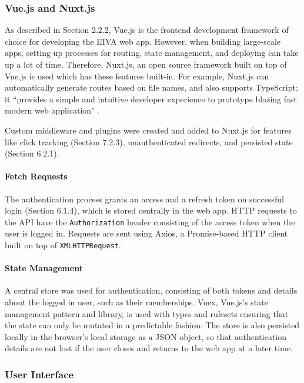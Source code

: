 \documentclass{article}
\begin{document}
\subsubsection{Vue.js and Nuxt.js}

As described in Section 2.2.2, Vue.js is the frontend development framework of choice for developing the EIVA web app. However, when building large-scale apps, setting up processes for routing, state management, and deploying can take up a lot of time. Therefore, Nuxt.js, an open source framework built on top of Vue.js is used which has these features built-in. For example, Nuxt.js can automatically generate routes based on file names, and also supports TypeScript; it ``provides a simple and intuitive developer experience to prototype blazing fast modern web application" \cite{alexchopin_announcing_nodate}.

Custom middleware and plugins were created and added to Nuxt.js for features like click tracking (Section 7.2.3), unauthenticated redirects, and persisted state (Section 6.2.1).

\paragraph{Fetch Requests}

The authentication process grants an access and a refresh token on successful login (Section 6.1.4), which is stored centrally in the web app. HTTP requests to the API have the \texttt{Authorization} header consisting of the access token when the user is logged in. Requests are sent using Axios, a Promise-based HTTP client built on top of  \texttt{XMLHTTPRequest}.

\paragraph{State Management}

A central store was used for authentication, consisting of both tokens and details about the logged in user, such as their memberships. Vuex, Vue.js's state management pattern and library, is used with types and rulesets ensuring that the state can only be mutated in a predictable fashion. The store is also persisted locally in the browser's local storage as a JSON object, so that authentication details are not lost if the user closes and returns to the web app at a later time.

\subsubsection{User Interface}
\end{document}
